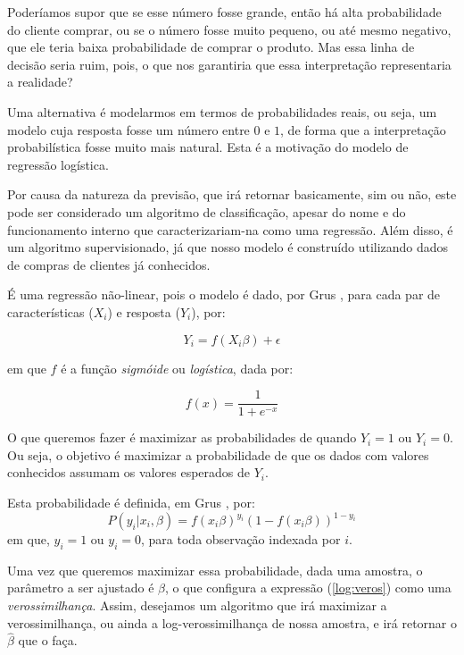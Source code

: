 Poderíamos supor que se esse número fosse grande, então há alta probabilidade do cliente comprar, ou se o número fosse muito pequeno, ou até mesmo negativo, que ele teria baixa probabilidade de comprar o produto. Mas essa linha de decisão seria ruim, pois, o que nos garantiria que essa interpretação representaria a realidade?

Uma alternativa é modelarmos em termos de probabilidades reais, ou seja, um modelo cuja resposta fosse um número entre $0$ e $1$, de forma que a interpretação probabilística fosse muito mais natural. Esta é a motivação do modelo de regressão logística.

Por causa da natureza da previsão, que irá retornar basicamente, sim ou não, este pode ser considerado um algoritmo de classificação, apesar do nome e do funcionamento interno que caracterizariam-na como uma regressão. Além disso, é um algoritmo supervisionado, já que nosso modelo é construído utilizando dados de compras de clientes já conhecidos.

É uma regressão não-linear, pois o modelo é dado, por Grus \citep{data}, para cada par de características ($X_i$) e resposta ($Y_i$), por:

\begin{equation}\label{log:f}
Y_i = f(X_i \beta) + \epsilon
\end{equation}

em que $f$ é a função \emph{sigmóide} ou \emph{logística}, dada por:

\[ f(x) =  \frac{1}{1 + e^{-x}} \]

O que queremos fazer é maximizar as probabilidades de quando $Y_i = 1$ ou $Y_i = 0$. Ou seja, o objetivo é maximizar a probabilidade de que os dados com valores conhecidos assumam os valores esperados de $Y_i$. 

Esta probabilidade é definida, em Grus \citep{data}, por:
\begin{equation}\label{log:veros}
P(y_i | x_i, \beta) = f(x_i \beta)^{y_i} (1 - f(x_i \beta))^{1-y_i}
\end{equation}
em que, $y_i = 1$ ou $y_i = 0$, para toda observação indexada por $i$.

Uma vez que queremos maximizar essa probabilidade, dada uma amostra, o parâmetro a ser ajustado é $\beta$, o que configura a expressão (\ref{log:veros}) como uma \emph{verossimilhança}. Assim, desejamos um algoritmo que irá maximizar a verossimilhança, ou ainda a log-verossimilhança de nossa amostra, e irá retornar o $\hat{\beta}$ que o faça.

